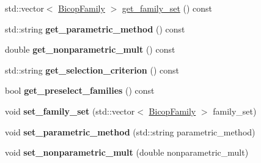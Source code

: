 \begin{DoxyCompactItemize}
\item 
std\+::vector$<$ \hyperlink{namespacevinecopulib_a42e95cc06d33896199caab0c11ad44f3}{Bicop\+Family} $>$ \hyperlink{classvinecopulib_1_1_fit_controls_bicop_a8ea096aec62cbca55641941c9b4cf8f8}{get\+\_\+family\+\_\+set} () const 
\item 
\hypertarget{classvinecopulib_1_1_fit_controls_bicop_a7399d0e67b734aeca98e47a8527ffea2}{std\+::string {\bfseries get\+\_\+parametric\+\_\+method} () const }\label{classvinecopulib_1_1_fit_controls_bicop_a7399d0e67b734aeca98e47a8527ffea2}

\item 
\hypertarget{classvinecopulib_1_1_fit_controls_bicop_a8358f3bf302abf5dcbc646b8ea6493bd}{double {\bfseries get\+\_\+nonparametric\+\_\+mult} () const }\label{classvinecopulib_1_1_fit_controls_bicop_a8358f3bf302abf5dcbc646b8ea6493bd}

\item 
\hypertarget{classvinecopulib_1_1_fit_controls_bicop_ae05604585084979bc8637aa7af881eab}{std\+::string {\bfseries get\+\_\+selection\+\_\+criterion} () const }\label{classvinecopulib_1_1_fit_controls_bicop_ae05604585084979bc8637aa7af881eab}

\item 
\hypertarget{classvinecopulib_1_1_fit_controls_bicop_a9f5a3c90dc779f4f0f694869e62e6240}{bool {\bfseries get\+\_\+preselect\+\_\+families} () const }\label{classvinecopulib_1_1_fit_controls_bicop_a9f5a3c90dc779f4f0f694869e62e6240}

\item 
\hypertarget{classvinecopulib_1_1_fit_controls_bicop_a39d4e24261da184abf3fa3dd11d1f23b}{void {\bfseries set\+\_\+family\+\_\+set} (std\+::vector$<$ \hyperlink{namespacevinecopulib_a42e95cc06d33896199caab0c11ad44f3}{Bicop\+Family} $>$ family\+\_\+set)}\label{classvinecopulib_1_1_fit_controls_bicop_a39d4e24261da184abf3fa3dd11d1f23b}

\item 
\hypertarget{classvinecopulib_1_1_fit_controls_bicop_a722bef09427577ba2f04c91d7e4dba90}{void {\bfseries set\+\_\+parametric\+\_\+method} (std\+::string parametric\+\_\+method)}\label{classvinecopulib_1_1_fit_controls_bicop_a722bef09427577ba2f04c91d7e4dba90}

\item 
\hypertarget{classvinecopulib_1_1_fit_controls_bicop_a69fa1ff241282cc5a968ff64f0029ae0}{void {\bfseries set\+\_\+nonparametric\+\_\+mult} (double nonparametric\+\_\+mult)}\label{classvinecopulib_1_1_fit_controls_bicop_a69fa1ff241282cc5a968ff64f0029ae0}


\end{DoxyCompactItemize}
